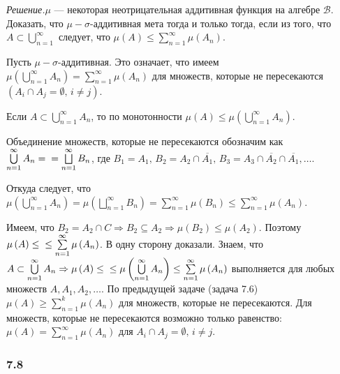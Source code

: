 \textit{Решение.}$ \mu $ --- некоторая неотрицательная аддитивная функция на алгебре $ \mathcal{B} $.
Доказать, что $ \mu - \sigma $-аддитивная мета тогда и только тогда, если из того,
что $A \subset \bigcup \limits_{n=1}^{ \infty }$ следует, что $ \mu \left( A \right) \leq \sum \limits_{n=1}^{ \infty } \mu \left( A_n \right) $.

Пусть $ \mu - \sigma $-аддитивная.
Это означает,
что имеем $ \mu \left( \bigcup \limits_{n=1}^{ \infty } A_n \right) = \sum \limits_{n=1}^{ \infty } \mu \left( A_n \right) $ для множеств,
которые не пересекаются $ \left( A_i \cap A_j = \emptyset, \, i \neq j \right) $.

Если $A \subset \bigcup \limits_{n=1}^{ \infty } A_n$, то по монотонности $ \mu \left( A \right) \leq \mu \left( \bigcup \limits_{n=1}^{ \infty } A_n \right) $.

Объединение множеств, которые не пересекаются обозначим как $ \bigcup \limits_{n=1}^{ \infty } A_n = \\
= \bigsqcup \limits_{n=1}^{ \infty } B_n$,
где $B_1 = A_1, \, B_2 = A_2 \cap \overline{A_1}, \, B_3 = A_3 \cap \overline{A_2} \cap \overline{A_1}, \dotsc $.

Откуда следует,
что
$ \mu \left( \bigcup \limits_{n=1}^{ \infty } A_n \right) =
\mu \left( \bigsqcup \limits_{n=1}^{ \infty } B_n \right) =
\sum \limits_{n=1}^{ \infty } \mu \left( B_n \right) \leq
\sum \limits_{n=1}^{ \infty } \mu \left( A_n \right) $.

Имеем, что $B_2 = A_2 \cap C \Rightarrow B_2 \subseteq A_2 \Rightarrow \mu \left( B_2 \right) \leq \mu \left( A_2 \right) $.
Поэтому $ \mu \left( A \right) \leq \\
\leq \sum \limits_{n=1}^{ \infty } \mu \left( A_n \right) $.
В одну сторону доказали.
Знаем,
что
$A \subset \bigcup \limits_{n=1}^{ \infty } A_n \Rightarrow
\mu \left( A \right) \leq \\
\leq \mu \left( \bigcup \limits_{n=1}^{ \infty } A_n \right) \leq
\sum \limits_{n=1}^{ \infty } \mu \left( A_n \right) $
выполняется для любых множеств $A, A_1, A_2, \dotsc $.
По предыдущей задаче (задача 7.6) $ \mu \left( A \right) \geq \sum \limits_{n=1}^k \mu \left( A_n \right) $ для множеств, которые не пересекаются.
Для множеств, которые не пересекаются возможно только равенство:
$ \mu \left( A \right) = \sum \limits_{n=1}^{ \infty } \mu \left( A_n \right) $ для $A_i \cap A_j = \emptyset, \, i \neq j$.

\subsubsection*{7.8}

